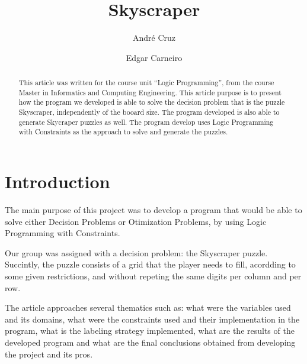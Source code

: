 \documentclass{llncs}
\begin{document}
\title{Skyscraper}
%
%
\author{André Cruz \and Edgar Carneiro}
%
%
%

\maketitle              %

\begin{abstract}
This article was written for the course unit ``Logic Programming'', from the course Master in Informatics and Computing Engineering.
This article purpose is to present how the program we developed is able to solve the decision problem that is the puzzle Skyscraper, independently of the booard size.
The program developed is also able to generate Skycraper puzzles as well. The program develop uses Logic Programming with Constraints as the approach to solve and generate the puzzles.
\end{abstract}
%
\section{Introduction}
%
The main purpose of this project was to develop a program that would be able to solve either Decision Problems or Otimization Problems, by using Logic Programming with Constraints.

Our group was assigned with a decision problem: the Skyscraper puzzle. Succintly, the puzzle consists of a grid that the player needs to fill, acordding to some given restrictions, and without repeting the same digits per column and per row.

The article approaches several thematics such as: what were the variables used and its domains, what were the constraints used and their implementation in the program, what is the labeling strategy implemented, what are the results of the developed program and what are the final conclusions obtained from developing the project and its pros.
\end{document}
